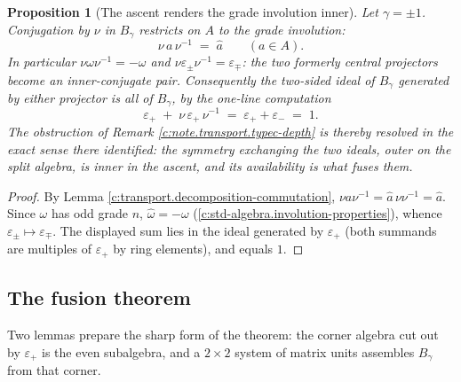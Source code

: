 \documentclass[11pt]{article}
\newtheorem{proposition}[theorem]{Proposition}
\theoremstyle{definition}
\theoremstyle{plain}
\begin{document}
\begin{proposition}[The ascent renders the grade involution inner]\label{c:transport.ascent-renders-grade-involution-inner}
Let $\gamma = \pm 1$. Conjugation by $\nu$ in $B_\gamma$ restricts on $A$ to the grade involution:
\[
\nu\, a\, \nu^{-1} \;=\; \hat{a} \qquad (a \in A).
\]
In particular $\nu \omega \nu^{-1} = -\omega$ and $\nu \varepsilon_\pm \nu^{-1} = \varepsilon_\mp$: the two formerly central projectors become an inner-conjugate pair. Consequently the two-sided ideal of $B_\gamma$ generated by either projector is all of $B_\gamma$, by the one-line computation
\[
\varepsilon_+ \;+\; \nu\,\varepsilon_+\,\nu^{-1} \;=\; \varepsilon_+ + \varepsilon_- \;=\; 1 .
\]
The obstruction of Remark \ref{c:note.transport.typec-depth} is thereby resolved in the exact sense there identified: the symmetry exchanging the two ideals, outer on the split algebra, is inner in the ascent, and its availability is what fuses them.
\end{proposition}
\begin{proof}
By Lemma \ref{c:transport.decomposition-commutation}, $\nu a \nu^{-1} = \hat{a}\,\nu\nu^{-1} = \hat{a}$. Since $\omega$ has odd grade $n$, $\hat{\omega} = -\omega$ (\ref{c:std-algebra.involution-properties}), whence $\varepsilon_\pm \mapsto \varepsilon_\mp$. The displayed sum lies in the ideal generated by $\varepsilon_+$ (both summands are multiples of $\varepsilon_+$ by ring elements), and equals $1$.

\end{proof}

\subsection*{The fusion theorem}
\label{c:note.transport.setting-fusion-theorem}
Two lemmas prepare the sharp form of the theorem: the corner algebra cut out by $\varepsilon_+$ is the even subalgebra, and a $2 \times 2$ system of matrix units assembles $B_\gamma$ from that corner.
\end{document}
